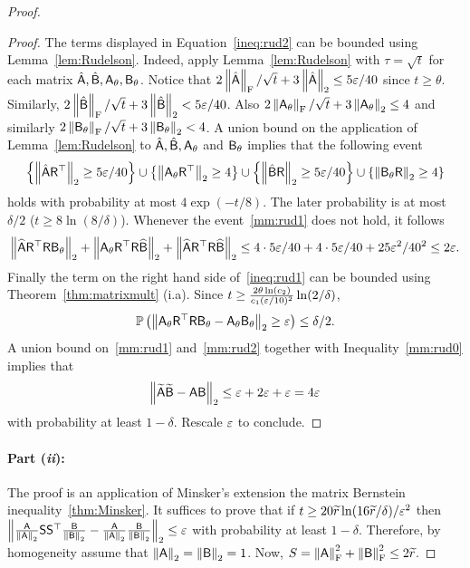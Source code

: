 \begin{proof}
\begin{proof}
%
The terms displayed in Equation~\eqref{ineq:rud2} can be bounded using Lemma~\ref{lem:Rudelson}. Indeed, apply Lemma~\ref{lem:Rudelson} with $\tau = \sqrt{t}$ for each matrix $\hat{{\mathsf{A} }}, \hat{{\mathsf{B} }}, {\mathsf{A} }_{\theta}, {\mathsf{B} }_{\theta}$. Notice that $2\left\|\hat{{\mathsf{A} }}\right\|_{\textrm{F}}/\sqrt{t} + 3\left\|\hat{{\mathsf{A} }}\right\|_2 \leq 5\varepsilon /40$ since $t\geq \theta$. Similarly, $2\left\|\hat{{\mathsf{B} }}\right\|_{\textrm{F}}/\sqrt{t} + 3\left\|\hat{{\mathsf{B} }}\right\|_2 < 5\varepsilon / 40$. Also $2\left\|{\mathsf{A} }_\theta\right\|_{\textrm{F}} /\sqrt{t} +3 \left\|{\mathsf{A} }_\theta\right\|_2 \leq 4$ and similarly $2\left\|{\mathsf{B} }_\theta\right\|_{\textrm{F}} /\sqrt{t} +3 \left\|{\mathsf{B} }_\theta\right\|_2 < 4$. A union bound on the application of Lemma~\ref{lem:Rudelson} to $\hat{{\mathsf{A} }}, \hat{{\mathsf{B} }}, {\mathsf{A} }_{\theta}$ and ${\mathsf{B} }_{\theta}$ implies that the following event
\begin{equation}\label{mm:rud1}
 \left\{ \left\|\hat{{\mathsf{A} }} {\mathsf{R} }^\top \right\|_2 \geq 5\varepsilon / 40 \right\} \cup \left\{ \left\|{\mathsf{A} }_{\theta} {\mathsf{R} }^\top \right\|_2 \geq 4 \right\} \cup \left\{ \left\|\hat{{\mathsf{B} }} {\mathsf{R} } \right\|_2 \geq 5\varepsilon / 40  \right\} \cup \left\{ \left\|{\mathsf{B} }_{\theta} {\mathsf{R} } \right\|_2 \geq 4 \right\}
\end{equation}
holds with probability at most $4\exp(-t /8)$. The later probability is at most $\delta /2$ ($t\geq 8 \ln(8/\delta)$). Whenever the event~\eqref{mm:rud1} does not hold, it follows
\[ \left\| \widehat{{\mathsf{A} }} {\mathsf{R} }^\top {\ensuremath{\mathsf{R} }} {\ensuremath{\mathsf{B} }}_\theta\right\|_2   +   \left\| {\mathsf{A} }_\theta {\ensuremath{\mathsf{R} }}^\top  {\ensuremath{\mathsf{R} }} \widehat{{\mathsf{B} }} \right\|_2 + \left\| \widehat{{\mathsf{A} }} {\mathsf{R} }^\top {\ensuremath{\mathsf{R} }} \widehat{{\mathsf{B} }}\right\|_2 \leq 4 \cdot 5\varepsilon /40 + 4\cdot 5\varepsilon /40 + 25\varepsilon^2 / 40^2 \leq 2\varepsilon . \]
Finally the term on the right hand side of~\eqref{ineq:rud1} can be bounded using Theorem~\ref{thm:matrixmult} (i.a). Since $t\geq \frac{2\theta \ln(c_2)}{c_1 (\varepsilon/10 )^2} \ln(2/\delta)$,
\begin{equation}\label{mm:rud2}
\mathbb{P}\left( \left\| {\mathsf{A} }_\theta {\ensuremath{\mathsf{R} }}^\top  {\ensuremath{\mathsf{R} }} {\ensuremath{\mathsf{B} }}_\theta - {\mathsf{A} }_\theta {\ensuremath{\mathsf{B} }}_\theta\right\|_2  \geq \varepsilon \right) \leq \delta /2.
\end{equation}
A union bound on~\eqref{mm:rud1} and~\eqref{mm:rud2} together with Inequality~\eqref{mm:rud0} implies that
\[ \left\| \widetilde{{\mathsf{A} }} \widetilde{{\mathsf{B} }} - {\mathsf{A} } {\mathsf{B} }\right\|_2 \leq \varepsilon +  2 \varepsilon + \varepsilon  = 4\varepsilon\]
with probability at least $1-\delta$. Rescale $\varepsilon$ to conclude.
\end{proof}
\paragraph{Part (\textit{ii}):}
The proof is an application of Minsker's extension the matrix Bernstein inequality~\ref{thm:Minsker}. It suffices to prove that if $t\geq 20\widetilde{r} \ln ( 16\widetilde{r}/\delta) /\varepsilon^2 $ then $\left\|\frac{{\mathsf{A} }}{\left\|{\mathsf{A} }\right\|_2} {\mathsf{S} } {\mathsf{S} }^\top \frac{{\mathsf{B} }}{\left\|{\mathsf{B} }\right\|_2} - \frac{{\mathsf{A} }}{\left\|{\mathsf{A} }\right\|_2} \frac{{\mathsf{B} }}{\left\|{\mathsf{B} }\right\|_2}\right\|_2 \leq \varepsilon$ with probability at least $1-\delta$. Therefore, by homogeneity assume that $\left\|{\mathsf{A} }\right\|_2=\left\|{\mathsf{B} }\right\|_2=1$. Now, $S = \left\|{\mathsf{A} }\right\|_{\textrm{F}}^2 + \left\|{\mathsf{B} }\right\|_{\textrm{F}}^2 \leq 2\widetilde{r}$.


\end{proof}
